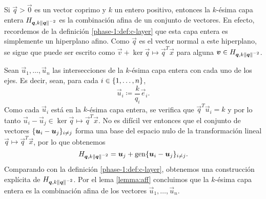 \begin{example}
	\label{ex:aff}


	Si $\vec{q} > \vec{0}$ es un vector coprimo y $k$ un entero positivo, entonces la $k$-ésima capa
	entera $H_{\boldsymbol{q}, k\left\lVert \boldsymbol{q} \right\rVert^{-2}}$ es la combinación afina de un conjunto de vectores.
	En efecto, recordemos de la definición \ref{phase-1:def:c-layer} que esta capa entera es
	simplemente un hiperplano afino. Como $\vec{q}$ es el vector normal a este hiperplano, se sigue
	que puede ser escrito como $\vec{v} + \ker{\vec{q} \mapsto \vec{q}^T\vec{x}}$ para alguna
	$\boldsymbol{v} \in H_{\boldsymbol{q}, k\left\lVert \boldsymbol{q} \right\rVert^{-2}}$.

	Sean $\vec{u}_1, \ldots, \vec{u}_n$ las intersecciones de la $k$-ésima capa entera con cada uno
	de los ejes. Es decir, sean, para cada $i \in \lbrace 1, \ldots, n \rbrace$,
	\begin{equation}
		\label{def:u-basis}
		\vec{u}_i \coloneq \frac{k}{q_i}\vec{e}_i.
	\end{equation}
	Como cada $\vec{u}_i$ está en la $k$-ésima capa entera, se verifica que $\vec{q}^T\vec{u}_i = k$
	y por lo tanto $\vec{u}_i - \vec{u}_j \in \ker{\vec{q} \mapsto \vec{q}^T\vec{x}}$. No es difícil
	ver entonces que el conjunto de vectores $\lbrace \boldsymbol{u}_i - \boldsymbol{u}_j \rbrace_{i \neq j}$ forma una
	base del espacio nulo de la transformación lineal $\vec{q} \mapsto \vec{q}^T\vec{x}$, por lo que
	obtenemos
	\begin{equation*}
		H_{\boldsymbol{q}, k\left\lVert \boldsymbol{q} \right\rVert^{-2}} = \boldsymbol{u}_j + \operatorname{gen}\lbrace \boldsymbol{u}_i - \boldsymbol{u}_j \rbrace_{i \neq
		j}.
	\end{equation*}
	Comparando con la definición \ref{phase-1:def:c-layer}, obtenemos una
	construcción explícita de $H_{\boldsymbol{\boldsymbol{q}}, k\left\lVert \boldsymbol{\boldsymbol{q}} \right\rVert^{-2}}$. Por el lema
	\ref{lemma:aff} concluimos que la $k$-ésima capa entera es la combinación
	afina de los vectores $\vec{u}_1, \ldots, \vec{u}_n$.
\end{example}

